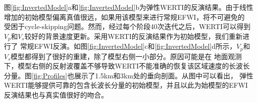 图\ref{fig:InvertedModel}a和\ref{fig:InvertedModel}b为弹性WERTI的反演结果。由于线性增加的初始模型偏离真值很远，如果用该模型来进行常规EFWI，将不可避免的
受困于cycle-skipping问题。然而，经过每个阶段40次迭代之后，WERTI可以得到$V_p$和$V_s$较好的背景速度更新。采用WERTI的反演结果作为初始模型，我们重新进行了
常规EFWI反演。如图\ref{fig:InvertedModel}c和\ref{fig:InvertedModel}d所示，$V_p$和$V_s$模型都得到了很好的重建，除了模型右侧一小部分。原因可能是在
地面观测下，模型右侧的反射波覆盖不够导致WERTI不能准确的恢复该区域速度的长波长分量。图\ref{fig:Profiles}也展示了1.5km和3km处的垂向剖面。从图中可以看出，
弹性WERTI能够提供可靠的包含长波长分量的初始模型，并且以此为始模型的EFWI反演结果也与真实值很好的吻合。
\begin{figure}[!htb]
   \centering
   \\
   \\

\end{figure}
